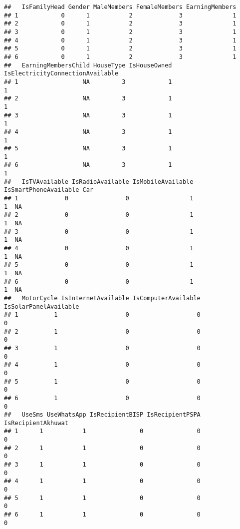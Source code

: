 \documentclass[
]{article}
\begin{document}
\begin{verbatim}
##   IsFamilyHead Gender MaleMembers FemaleMembers EarningMembers
## 1            0      1           2             3              1
## 2            0      1           2             3              1
## 3            0      1           2             3              1
## 4            0      1           2             3              1
## 5            0      1           2             3              1
## 6            0      1           2             3              1
##   EarningMembersChild HouseType IsHouseOwned IsElectricityConnectionAvailable
## 1                  NA         3            1                                1
## 2                  NA         3            1                                1
## 3                  NA         3            1                                1
## 4                  NA         3            1                                1
## 5                  NA         3            1                                1
## 6                  NA         3            1                                1
##   IsTVAvailable IsRadioAvailable IsMobileAvailable IsSmartPhoneAvailable Car
## 1             0                0                 1                     1  NA
## 2             0                0                 1                     1  NA
## 3             0                0                 1                     1  NA
## 4             0                0                 1                     1  NA
## 5             0                0                 1                     1  NA
## 6             0                0                 1                     1  NA
##   MotorCycle IsInternetAvailable IsComputerAvailable IsSolarPanelAvailable
## 1          1                   0                   0                     0
## 2          1                   0                   0                     0
## 3          1                   0                   0                     0
## 4          1                   0                   0                     0
## 5          1                   0                   0                     0
## 6          1                   0                   0                     0
##   UseSms UseWhatsApp IsRecipientBISP IsRecipientPSPA IsRecipientAkhuwat
## 1      1           1               0               0                  0
## 2      1           1               0               0                  0
## 3      1           1               0               0                  0
## 4      1           1               0               0                  0
## 5      1           1               0               0                  0
## 6      1           1               0               0                  0

\end{verbatim}
\end{document}
